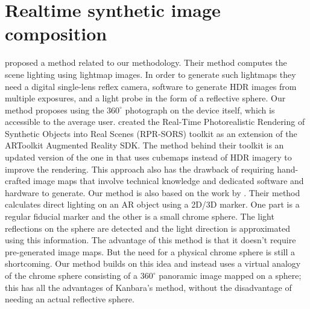 \section{Realtime synthetic image composition}
\citep{agusanto2003} proposed a method related to our methodology. Their method computes the scene lighting using lightmap images. In order to generate such lightmaps they need a digital single-lens reflex camera, software to generate HDR images from multiple exposures, and a light probe in the form of a reflective sphere. Our method proposes using the $360^{\circ}$ photograph on the device itself, which is accessible to the average user.\newline
\citep{pessoa2011} created the Real-Time Photorealistic Rendering of Synthetic Objects into Real Scenes (RPR-SORS) toolkit as an extension of the ARToolkit Augmented Reality SDK. The method behind their toolkit is an updated version of the one in \citet{agusanto2003} that uses cubemaps instead of HDR imagery to improve the rendering. This approach also has the drawback of requiring hand-crafted image maps that involve technical knowledge and dedicated software and hardware to generate.\newline
Our method is also based on the work by \citep{kanbara2004}. Their method calculates direct lighting on an AR object using a 2D/3D marker. One part is a regular fiducial marker and the other is a small chrome sphere. The light reflections on the sphere are detected and the light direction is approximated using this information. The advantage of this method is that it doesn't require pre-generated image maps. But the need for a physical chrome sphere is still a shortcoming. Our method builds on this idea and instead uses a virtual analogy of the chrome sphere consisting of a $360^{\circ}$ panoramic image mapped on a sphere; this has all the advantages of Kanbara's method, without the disadvantage of needing an actual reflective sphere.